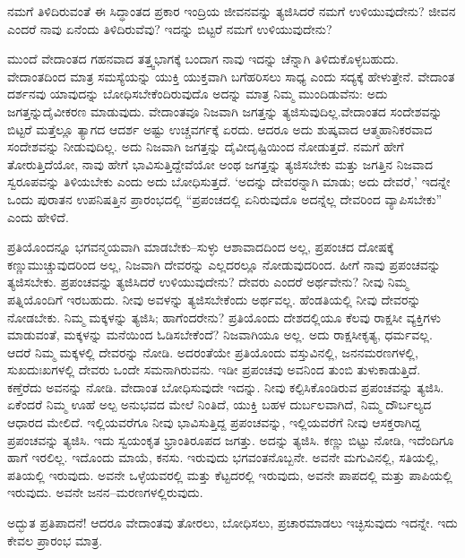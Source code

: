 \vskip 0.2cm 

ನಮಗೆ ತಿಳಿದಿರುವಂತೆ ಈ ಸಿದ್ಧಾಂತದ ಪ್ರಕಾರ ಇಂದ್ರಿಯ ಜೀವನವನ್ನು ತ್ಯಜಿಸಿದರೆ ನಮಗೆ ಉಳಿಯುವುದೇನು? ಜೀವನ ಎಂದರೆ ನಾವು ಏನೆಂದು ತಿಳಿದಿರುವೆವು? ಇದನ್ನು ಬಿಟ್ಟರೆ ನಮಗೆ ಉಳಿಯುವುದೇನು?

\vskip 0.2cm 

ಮುಂದೆ ವೇದಾಂತದ ಗಹನವಾದ ತತ್ತ್ವಭಾಗಕ್ಕೆ ಬಂದಾಗ ನಾವು ಇದನ್ನು ಚೆನ್ನಾಗಿ ತಿಳಿದುಕೊಳ್ಳಬಹುದು. ವೇದಾಂತದಿಂದ ಮಾತ್ರ ಸಮಸ್ಯೆಯನ್ನು ಯುಕ್ತಿ ಯುಕ್ತವಾಗಿ ಬಗೆಹರಿಸಲು ಸಾಧ್ಯ ಎಂದು ಸದ್ಯಕ್ಕೆ ಹೇಳುತ್ತೇನೆ. ವೇದಾಂತ ದರ್ಶನವು ಯಾವುದನ್ನು ಬೋಧಿಸಬೇಕೆಂದಿರುವುದೊ ಅದನ್ನು ಮಾತ್ರ ನಿಮ್ಮ ಮುಂದಿಡುವೆನು: ಅದು ಜಗತ್ತನ್ನು\break ದೈವೀಕರಣ ಮಾಡುವುದು. ವೇದಾಂತವೂ ನಿಜವಾಗಿ ಜಗತ್ತನ್ನು ತ್ಯಜಿಸುವುದಿಲ್ಲ.\break ವೇದಾಂತದ ಸಂದೇಶವನ್ನು ಬಿಟ್ಟರೆ ಮತ್ತೆಲ್ಲೂ ತ್ಯಾಗದ ಆದರ್ಶ ಅಷ್ಟು ಉಚ್ಚವರ್ಗಕ್ಕೆ ಏರದು. ಆದರೂ ಅದು ಶುಷ್ಕವಾದ ಆತ್ಮಹಾನಿಕರವಾದ ಸಂದೇಶವನ್ನು ನೀಡುವುದಿಲ್ಲ. ಅದು ನಿಜವಾಗಿ ಜಗತ್ತನ್ನು ದೈವೀದೃಷ್ಟಿಯಿಂದ ನೋಡುತ್ತದೆ. ನಮಗೆ ಹೇಗೆ ತೋರುತ್ತಿದೆಯೋ, ನಾವು ಹೇಗೆ ಭಾವಿಸುತ್ತಿದ್ದೇವೆಯೋ ಅಂಥ ಜಗತ್ತನ್ನು ತ್ಯಜಿಸಬೇಕು ಮತ್ತು ಜಗತ್ತಿನ ನಿಜವಾದ ಸ್ವರೂಪವನ್ನು ತಿಳಿಯಬೇಕು ಎಂದು ಅದು ಬೋಧಿಸುತ್ತದೆ. ‘ಅದನ್ನು ದೇವರನ್ನಾಗಿ ಮಾಡು; ಅದು ದೇವರೆ,’ ಇದನ್ನೇ ಒಂದು ಪುರಾತನ ಉಪನಿಷತ್ತಿನ ಪ್ರಾರಂಭದಲ್ಲಿ “ಪ್ರಪಂಚದಲ್ಲಿ ಏನಿರುವುದೊ ಅದನ್ನೆಲ್ಲ ದೇವರಿಂದ ವ್ಯಾಪಿಸಬೇಕು” ಎಂದು ಹೇಳಿದೆ.

ಪ್ರತಿಯೊಂದನ್ನೂ ಭಗವನ್ಮಯವಾಗಿ ಮಾಡಬೇಕು–ಸುಳ್ಳು ಆಶಾವಾದದಿಂದ ಅಲ್ಲ, ಪ್ರಪಂಚದ ದೋಷಕ್ಕೆ ಕಣ್ಣುಮುಚ್ಚುವುದರಿಂದ ಅಲ್ಲ, ನಿಜವಾಗಿ ದೇವರನ್ನು ಎಲ್ಲದರಲ್ಲೂ ನೋಡುವುದರಿಂದ. ಹೀಗೆ ನಾವು ಪ್ರಪಂಚವನ್ನು ತ್ಯಜಿಸಬೇಕು. ಪ್ರಪಂಚವನ್ನು ತ್ಯಜಿಸಿದರೆ ಉಳಿಯುವುದೇನು? ದೇವರು ಎಂದರೆ ಅರ್ಥವೇನು? ನೀವು ನಿಮ್ಮ ಪತ್ನಿಯೊಂದಿಗೆ ಇರಬಹುದು. ನೀವು ಅವಳನ್ನು ತ್ಯಜಿಸಬೇಕೆಂದು ಅರ್ಥವಲ್ಲ. ಹೆಂಡತಿಯಲ್ಲಿ ನೀವು ದೇವರನ್ನು ನೋಡಬೇಕು. ನಿಮ್ಮ ಮಕ್ಕಳನ್ನು ತ್ಯಜಿಸಿ; ಹಾಗೆಂದರೇನು? ಪ್ರತಿಯೊಂದು ದೇಶದಲ್ಲಿಯೂ ಕೆಲವು ರಾಕ್ಷಸೀ ವ್ಯಕ್ತಿಗಳು ಮಾಡುವಂತೆ, ಮಕ್ಕಳನ್ನು ಮನೆಯಿಂದ ಓಡಿಸಬೇಕೆಂದೆ? ನಿಜವಾಗಿಯೂ ಅಲ್ಲ. ಅದು ರಾಕ್ಷಸೀಕೃತ್ಯ, ಧರ್ಮವಲ್ಲ. ಆದರೆ ನಿಮ್ಮ ಮಕ್ಕಳಲ್ಲಿ ದೇವರನ್ನು ನೋಡಿ. ಅದರಂತೆಯೇ ಪ್ರತಿಯೊಂದು ವಸ್ತುವಿನಲ್ಲಿ, ಜನನಮರಣಗಳಲ್ಲಿ, ಸುಖದುಃಖಗಳಲ್ಲಿ ದೇವರು ಒಂದೇ ಸಮನಾಗಿರುವನು. ಇಡೀ ಪ್ರಪಂಚವು ಅವನಿಂದ ತುಂಬಿ ತುಳುಕಾಡುತ್ತಿದೆ. ಕಣ್ತೆರೆದು ಅವನನ್ನು ನೋಡಿ. ವೇದಾಂತ ಬೋಧಿಸುವುದೇ ಇದನ್ನು. ನೀವು ಕಲ್ಪಿಸಿಕೊಂಡಿರುವ ಪ್ರಪಂಚವನ್ನು ತ್ಯಜಿಸಿ. ಏಕೆಂದರೆ ನಿಮ್ಮ ಊಹೆ ಅಲ್ಪ ಅನುಭವದ ಮೇಲೆ ನಿಂತಿದೆ, ಯುಕ್ತಿ ಬಹಳ ದುರ್ಬಲವಾಗಿದೆ, ನಿಮ್ಮ ದೌರ್ಬಲ್ಯದ ಆಧಾರದ ಮೇಲಿದೆ. ಇಲ್ಲಿಯವರೆಗೂ ನೀವು ಭಾವಿಸುತ್ತಿದ್ದ ಪ್ರಪಂಚವನ್ನು, ಇಲ್ಲಿಯವರೆಗೆ ನೀವು ಆಸಕ್ತರಾಗಿದ್ದ ಪ್ರಪಂಚವನ್ನು ತ್ಯಜಿಸಿ. ಇದು ಸ್ವಯಂಕೃತ ಭ್ರಾಂತಿರೂಪದ ಜಗತ್ತು. ಅದನ್ನು ತ್ಯಜಿಸಿ. ಕಣ್ಣು ಬಿಟ್ಟು ನೋಡಿ, ಇದೆಂದಿಗೂ ಹಾಗೆ ಇರಲಿಲ್ಲ. ಇದೊಂದು ಮಾಯೆ, ಕನಸು. ಇರುವುದು ಭಗವಂತನೊಬ್ಬನೇ. ಅವನೇ ಮಗುವಿನಲ್ಲಿ, ಸತಿಯಲ್ಲಿ, ಪತಿಯಲ್ಲಿ ಇರುವುದು. ಅವನೇ ಒಳ್ಳೆಯವರಲ್ಲಿ ಮತ್ತು ಕೆಟ್ಟದರಲ್ಲಿ ಇರುವುದು, ಅವನೇ ಪಾಪದಲ್ಲಿ ಮತ್ತು ಪಾಪಿಯಲ್ಲಿ ಇರುವುದು. ಅವನೇ ಜನನ–ಮರಣಗಳಲ್ಲಿರುವುದು.

ಅದ್ಭುತ ಪ್ರತಿಪಾದನೆ! ಆದರೂ ವೇದಾಂತವು ತೋರಲು, ಬೋಧಿಸಲು, ಪ್ರಚಾರಮಾಡಲು ಇಚ್ಛಿಸುವುದು ಇದನ್ನೇ. ಇದು ಕೇವಲ ಪ್ರಾರಂಭ ಮಾತ್ರ.

\eject

